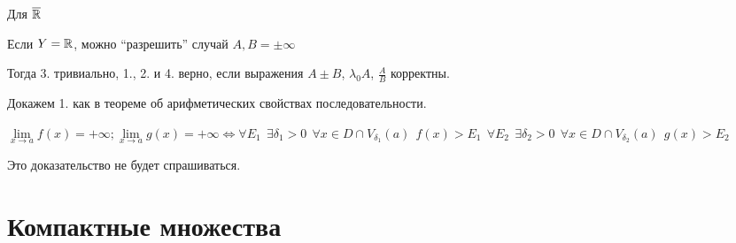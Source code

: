 \begin{remark}
    Для $\overline {\operatorname*{\mathbb{R}}}$

    Если $Y=\operatorname*{\mathbb{R}}$, можно ``разрешить'' случай $A, B=\pm \infty$

    Тогда 3. тривиально, 1., 2. и 4. верно, если выражения $A\pm B$, $\lambda_0 A$, $\frac{A}{B}$ корректны.

    Докажем 1. как в теореме об арифметических свойствах последовательности.

    $\lim\limits_{x\to a} f(x) = +\infty; \lim\limits_{x\to a} g(x) = +\infty \Leftrightarrow \forall E_1 \ \ \exists \delta_1>0 \ \ \forall x\in D\cap V_{\delta_1}(a) \ \ f(x) > E_1 \ \ \forall E_2 \ \ \exists \delta_2>0 \ \ \forall x\in D\cap V_{\delta_2}(a) \ \ g(x) > E_2$
\end{remark}
Это доказательство не будет спрашиваться.

\section{Компактные множества}

